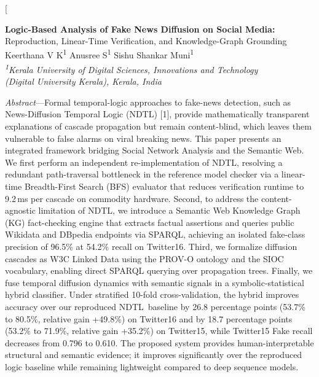 \documentclass[10pt,twocolumn,a4paper]{article}
\newcommand{\NDTL}{\textsc{NDTL}}
\begin{document}
 
\twocolumn[{%
\begin{@twocolumnfalse}
\begin{center}
{\fontsize{19}{23}\selectfont \textbf{Logic-Based Analysis of Fake News Diffusion on Social Media:}}\\[4pt]
{\fontsize{13}{17}\selectfont Reproduction, Linear-Time Verification, and Knowledge-Graph Grounding}\\[10pt]
{\large Keerthana V K\textsuperscript{1}\hspace{2em} Anusree S\textsuperscript{1}\hspace{2em} Sishu Shankar Muni\textsuperscript{1}}\\[4pt]
{\small\itshape \textsuperscript{1}Kerala University of Digital Sciences, Innovations and Technology\\ (Digital University Kerala), Kerala, India}
\end{center}
\vspace{4pt}
\begin{center}
\begin{minipage}{0.92\textwidth}
\footnotesize
\noindent\textit{Abstract}---Formal temporal-logic approaches to fake-news detection, such as News-Diffusion Temporal Logic (\NDTL) [1], provide mathematically transparent explanations of cascade propagation but remain content-blind, which leaves them vulnerable to false alarms on viral breaking news. This paper presents an integrated framework bridging Social Network Analysis and the Semantic Web. We first perform an independent re-implementation of \NDTL, resolving a redundant path-traversal bottleneck in the reference model checker via a linear-time Breadth-First Search (BFS) evaluator that reduces verification runtime to 9.2\,ms per cascade on commodity hardware. Second, to address the content-agnostic limitation of \NDTL, we introduce a Semantic Web Knowledge Graph (KG) fact-checking engine that extracts factual assertions and queries public Wikidata and DBpedia endpoints via SPARQL, achieving an isolated fake-class precision of 96.5\% at 54.2\% recall on Twitter16. Third, we formalize diffusion cascades as W3C Linked Data using the PROV-O ontology and the SIOC vocabulary, enabling direct SPARQL querying over propagation trees. Finally, we fuse temporal diffusion dynamics with semantic signals in a symbolic-statistical hybrid classifier. Under stratified 10-fold cross-validation, the hybrid improves accuracy over our reproduced \NDTL\ baseline by 26.8 percentage points (53.7\% to 80.5\%, relative gain +49.8\%) on Twitter16 and by 18.7 percentage points (53.2\% to 71.9\%, relative gain +35.2\%) on Twitter15, while Twitter15 Fake recall decreases from 0.796 to 0.610. The proposed system provides human-interpretable structural and semantic evidence; it improves significantly over the reproduced logic baseline while remaining lightweight compared to deep sequence models.
 

\end{minipage}
\end{center}
\end{@twocolumnfalse}}
\end{document}
